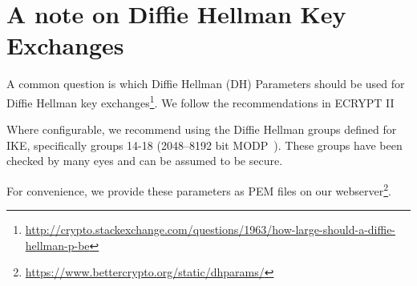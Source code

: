\section{A note on Diffie Hellman Key Exchanges}
\label{section:DH}

A common question is which Diffie Hellman (DH) Parameters  should be used for
Diffie Hellman key
exchanges\footnote{\url{http://crypto.stackexchange.com/questions/1963/how-large-should-a-diffie-hellman-p-be}}.
We follow the recommendations in ECRYPT II~\cite[chapter 16]{ii2011ecrypt}

Where configurable, we recommend using the Diffie Hellman groups
defined for IKE, specifically groups 14-18 (2048--8192 bit MODP~\cite{rfc3526}).
These groups have been checked by many eyes and can be assumed to be secure.

For convenience, we provide these parameters as PEM files on our webserver\footnote{\url{https://www.bettercrypto.org/static/dhparams/}}. 

